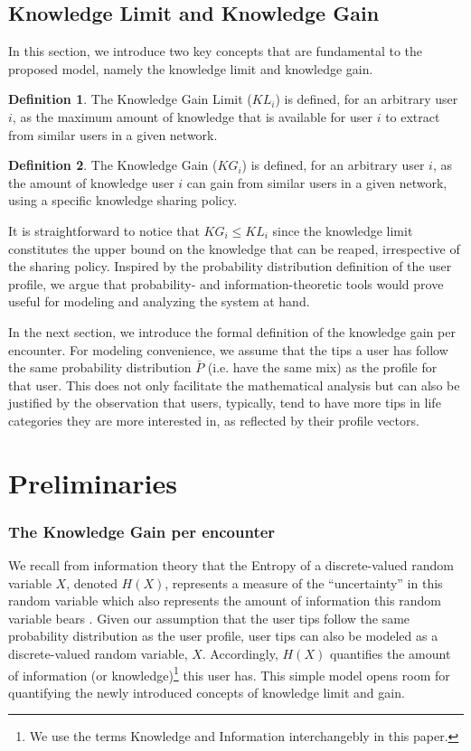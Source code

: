 \documentclass[conference]{IEEEtran}
\theoremstyle{definition}
\newtheorem{defn}{Definition}[section]
\begin{document}
\subsection{Knowledge Limit and Knowledge Gain}
In this section, we introduce two key concepts that are fundamental to the proposed model, namely the knowledge limit and knowledge gain.
\begin{defn}
The Knowledge Gain Limit ($KL_i$) is defined, for an arbitrary user $i$, as the maximum amount of knowledge that is available for user $i$ to extract from similar users in a given network.
\end{defn}
\begin{defn}
The Knowledge Gain ($KG_i$) is defined, for an arbitrary user $i$, as the amount of knowledge user $i$ can gain from similar users in a given network, using a specific knowledge sharing policy.
\end{defn}
\vspace{-0.2 cm}
It is straightforward to notice that $KG_i \le KL_i$ since the knowledge limit constitutes the upper bound on the knowledge that can be reaped, irrespective of the sharing policy. Inspired by the probability distribution definition of the user profile, we argue that probability- and information-theoretic tools would prove useful for modeling and analyzing the system at hand.

In the next section, we introduce the formal definition of the knowledge gain per encounter. For modeling convenience, we assume that the tips a user has follow the same probability distribution $\bar{P}$ (i.e. have the same mix) as the profile for that user. This does not only facilitate the mathematical analysis but can also be justified by the observation that users, typically, tend to have more tips in life categories they are more interested in, as reflected by their profile vectors.


\vspace{-0.1 cm}
\section{Preliminaries}
\subsubsection{The Knowledge Gain per encounter}

We recall from information theory that the Entropy of a discrete-valued random variable $X$, denoted $H(X)$, represents a measure of the ``uncertainty'' in this random variable which also represents the amount of information this random variable bears \cite{cover}. Given our assumption that the user tips follow the same probability distribution as the user profile, user tips can also be modeled as a discrete-valued random variable, $X$. Accordingly, $H(X)$ 
quantifies the amount of information (or knowledge)\footnote{We use the terms Knowledge and Information interchangebly in this paper.} this user has. This simple model opens room for quantifying the newly introduced concepts of knowledge limit and gain.
\end{document}
